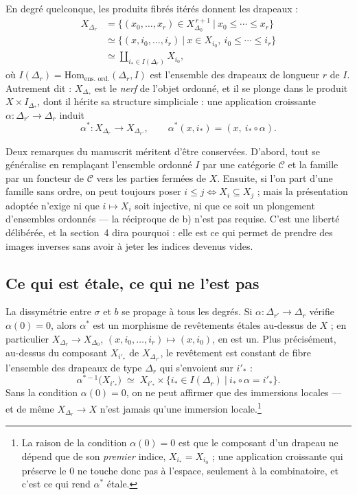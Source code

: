 \documentclass[11pt,a4paper]{article}
\begin{document}
En degré quelconque, les produits fibrés itérés donnent les drapeaux :
\[
  \begin{aligned}
    X_{\Delta_{r}}
      &= \bigl\{ (x_{0},\ldots,x_{r}) \in X_{\Delta_{0}}^{\,r+1}
        \ \big|\ x_{0} \leq \cdots \leq x_{r} \bigr\} \\
      &\simeq \bigl\{ (x, i_{0},\ldots,i_{r}) \ \big|\
        x \in X_{i_{0}},\ i_{0} \leq \cdots \leq i_{r} \bigr\} \\
      &\simeq \coprod_{i_{*} \in I(\Delta_{r})} X_{i_{0}},
  \end{aligned}
\]
où $I(\Delta_{r}) = \mathrm{Hom}_{\text{ens. ord.}}(\Delta_{r}, I)$ est
l'ensemble des drapeaux de longueur $r$ de $I$. Autrement dit :
$X_{\Delta_{*}}$ est le \emph{nerf} de l'objet ordonné, et il se plonge dans le
produit $X \times I_{\Delta_{*}}$, dont il hérite sa structure simpliciale :
une application croissante $\alpha \colon \Delta_{r'} \to \Delta_{r}$ induit
\[
  \alpha^{*} \colon X_{\Delta_{r}} \longrightarrow X_{\Delta_{r'}},
  \qquad \alpha^{*}(x,i_{*}) = (x,\ i_{*} \circ \alpha).
\]

Deux remarques du manuscrit méritent d'être conservées. D'abord, tout se
généralise en remplaçant l'ensemble ordonné $I$ par une catégorie
$\mathcal{C}$ et la famille par un foncteur de $\mathcal{C}$ vers les parties
fermées de $X$. Ensuite, si l'on part d'une famille sans ordre, on peut toujours
poser $i \leq j \iff X_{i} \subseteq X_{j}$ ; mais la présentation adoptée
n'exige ni que $i \mapsto X_{i}$ soit injective, ni que ce soit un plongement
d'ensembles ordonnés — la réciproque de b) n'est pas requise. C'est une liberté
délibérée, et la section~4 dira pourquoi : elle est ce qui permet de prendre des
images inverses sans avoir à jeter les indices devenus vides.

\subsection*{Ce qui est étale, ce qui ne l'est pas}

La dissymétrie entre $\sigma$ et $b$ se propage à tous les degrés. Si
$\alpha \colon \Delta_{r'} \to \Delta_{r}$ vérifie $\alpha(0) = 0$, alors
$\alpha^{*}$ est un morphisme de revêtements étales au-dessus de $X$ ; en
particulier $X_{\Delta_{r}} \to X_{\Delta_{0}}$, $(x,i_{0},\ldots,i_{r}) \mapsto
(x,i_{0})$, en est un. Plus précisément, au-dessus du composant $X_{i'_{*}}$ de
$X_{\Delta_{r'}}$, le revêtement est constant de fibre l'ensemble des drapeaux
de type $\Delta_{r}$ qui s'envoient sur $i'_{*}$ :
\[
  \alpha^{*-1}\bigl(X_{i'_{*}}\bigr) \;\simeq\;
  X_{i'_{*}} \times \bigl\{ i_{*} \in I(\Delta_{r})
    \ \big|\ i_{*} \circ \alpha = i'_{*} \bigr\}.
\]
Sans la condition $\alpha(0) = 0$, on ne peut affirmer que des immersions
locales — et de même $X_{\Delta_{r}} \to X$ n'est jamais qu'une immersion
locale.\footnote{La raison de la condition $\alpha(0) = 0$ est que le composant
d'un drapeau ne dépend que de son \emph{premier} indice, $X_{i_{*}} = X_{i_{0}}$ ;
une application croissante qui préserve le $0$ ne touche donc pas à l'espace,
seulement à la combinatoire, et c'est ce qui rend $\alpha^{*}$ étale.}
\end{document}

